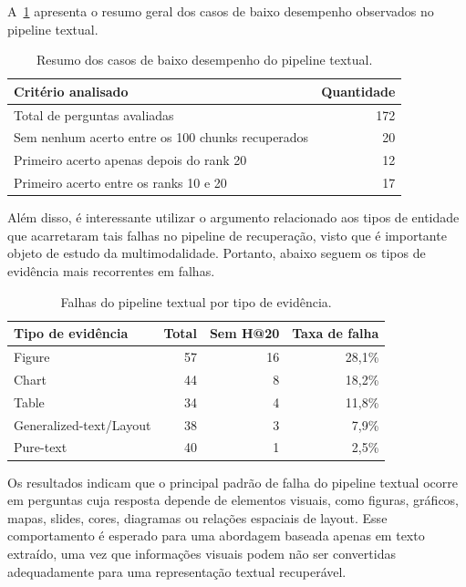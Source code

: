 A~\ref{tab:baixo-desempenho-resumo} apresenta o resumo geral dos casos de baixo desempenho observados no pipeline textual.

\begin{table}[htbp]
\centering
\caption{Resumo dos casos de baixo desempenho do pipeline textual.}
\label{tab:baixo-desempenho-resumo}
\small
\begin{tabular}{p{9.2cm}r}
\toprule
\textbf{Critério analisado} & \textbf{Quantidade} \\
\midrule
Total de perguntas avaliadas & 172 \\
Sem nenhum acerto entre os 100 chunks recuperados & 20 \\
Primeiro acerto apenas depois do rank 20 & 12 \\
Primeiro acerto entre os ranks 10 e 20 & 17 \\
\bottomrule
\end{tabular}
\end{table}

Além disso, é interessante utilizar o argumento relacionado aos tipos de entidade que acarretaram tais falhas no pipeline de recuperação, visto que é importante objeto de estudo da multimodalidade. Portanto, abaixo seguem os tipos de evidência mais recorrentes em falhas.


\begin{table}[htbp]
\centering
\caption{Falhas do pipeline textual por tipo de evidência.}
\label{tab:falhas-tipo-evidencia}
\small
\begin{tabular}{lrrr}
\toprule
\textbf{Tipo de evidência} & \textbf{Total} & \textbf{Sem H@20} & \textbf{Taxa de falha} \\
\midrule
Figure & 57 & 16 & 28,1\% \\
Chart & 44 & 8 & 18,2\% \\
Table & 34 & 4 & 11,8\% \\
Generalized-text/Layout & 38 & 3 & 7,9\% \\
Pure-text & 40 & 1 & 2,5\% \\
\bottomrule
\end{tabular}
\end{table}

Os resultados indicam que o principal padrão de falha do pipeline textual ocorre em perguntas cuja resposta depende de elementos visuais, como figuras, gráficos, mapas, slides, cores, diagramas ou relações espaciais de layout. Esse comportamento é esperado para uma abordagem baseada apenas em texto extraído, uma vez que informações visuais podem não ser convertidas adequadamente para uma representação textual recuperável.

